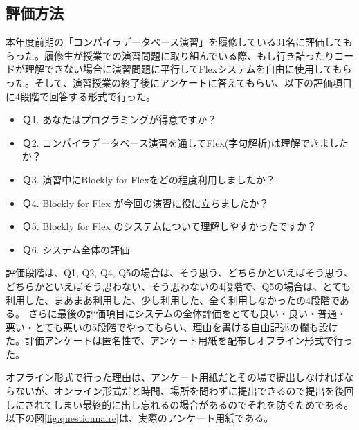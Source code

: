 \documentclass{risepaper}
\begin{document}
   		\subsection{評価方法}
        
本年度前期の「コンパイラデータベース演習」を履修している31名に評価してもらった。履修生が授業での演習問題に取り組んでいる際、もし行き詰ったりコードが理解できない場合に演習問題に平行してFlexシステムを自由に使用してもらった。そして、演習授業の終了後にアンケートに答えてもらい、以下の評価項目に4段階で回答する形式で行った。
\begin{itemize}
\item Ｑ1. あなたはプログラミングが得意ですか？
\item Ｑ2. コンパイラデータベース演習を通してFlex(字句解析)は理解できましたか？
\item Ｑ3. 演習中にBlockly for Flexをどの程度利用しましたか？
\item Ｑ4. Blockly for Flex が今回の演習に役に立ちましたか？
\item Ｑ5. Blockly for Flex のシステムについて理解しやすかったですか？
\item Ｑ6. システム全体の評価
\end{itemize} 
評価段階は、Q1, Q2, Q4, Q5の場合は、そう思う、どちらかといえばそう思う、どちらかといえばそう思わない、そう思わないの4段階で、Q5の場合は、とても利用した、まあまあ利用した、少し利用した、全く利用しなかったの4段階である。
さらに最後の評価項目にシステムの全体評価をとても良い・良い・普通・悪い・とても悪いの5段階でやってもらい、理由を書ける自由記述の欄も設けた。評価アンケートは匿名性で、アンケート用紙を配布しオフライン形式で行った。

オフライン形式で行った理由は、アンケート用紙だとその場で提出しなければならないが、オンライン形式だと時間、場所を問わずに提出できるので提出を後回しにされてしまい最終的に出し忘れるの場合があるのでそれを防ぐためである。以下の図\ref{fig:questionnaire}は、実際のアンケート用紙である。
\end{document}
